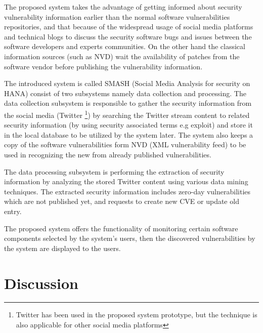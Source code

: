 \documentclass{llncs}
\begin{document}
\par
The proposed system takes the advantage of getting informed about security vulnerability information earlier than the normal software vulnerabilities repositories, and that because of the widespread usage of social media platforms and technical blogs to discuss the security software bugs and issues between the software developers and experts communities. On the other hand the classical information sources (such as NVD) wait the availability of patches from the software vendor before publishing the vulnerability information.

\par The introduced system is called SMASH (Social Media Analysis for security on HANA) consist of two subsystems namely data collection and processing. The data collection subsystem is responsible to gather the security information from the social media (Twitter \footnote{Twitter has been used in the proposed system prototype, but the technique is also applicable for other social media platforms}) by searching the Twitter stream content to related security information (by using security associated terms e.g exploit) and store it in the local database to be utilized by the system later. The system also keeps a copy of the software vulnerabilities form NVD (XML vulnerability feed) to be used in recognizing the new from already published vulnerabilities.
\par
The data processing subsystem is performing the extraction of security information by analyzing the stored Twitter content using various data mining techniques. The extracted security information 
includes zero-day vulnerabilities which are not published yet, and requests to create new CVE or update old entry.

The proposed system offers the functionality of monitoring certain software components selected by the system's users, then the discovered vulnerabilities by the system are displayed to the users.
  

\section{Discussion}
\end{document}
